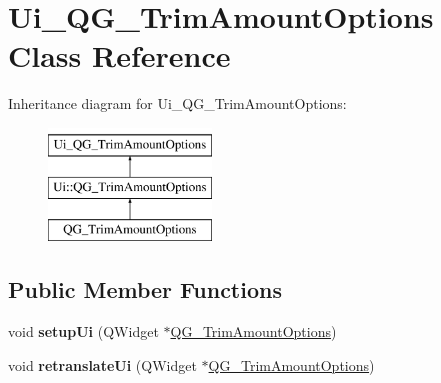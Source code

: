 \hypertarget{classUi__QG__TrimAmountOptions}{\section{Ui\-\_\-\-Q\-G\-\_\-\-Trim\-Amount\-Options Class Reference}
\label{classUi__QG__TrimAmountOptions}
}
Inheritance diagram for Ui\-\_\-\-Q\-G\-\_\-\-Trim\-Amount\-Options\-:\begin{figure}[H]
\begin{center}
\leavevmode
\includegraphics[height=3.000000cm]{classUi__QG__TrimAmountOptions}
\end{center}
\end{figure}
\subsection*{Public Member Functions}
\begin{DoxyCompactItemize}
\item 
\hypertarget{classUi__QG__TrimAmountOptions_a4ccda208ccab75de76b95791dbb4b7a2}{void {\bfseries setup\-Ui} (Q\-Widget $\ast$\hyperlink{classQG__TrimAmountOptions}{Q\-G\-\_\-\-Trim\-Amount\-Options})}\label{classUi__QG__TrimAmountOptions_a4ccda208ccab75de76b95791dbb4b7a2}

\item 
\hypertarget{classUi__QG__TrimAmountOptions_a16296298fa443cbc6bca6b207419ea63}{void {\bfseries retranslate\-Ui} (Q\-Widget $\ast$\hyperlink{classQG__TrimAmountOptions}{Q\-G\-\_\-\-Trim\-Amount\-Options})}\label{classUi__QG__TrimAmountOptions_a16296298fa443cbc6bca6b207419ea63}

\end{DoxyCompactItemize}
